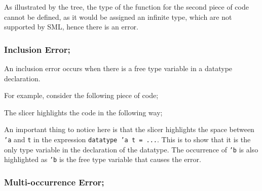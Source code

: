 \documentclass{report}
\begin{document}
\begin{itemize}



As illustrated by the tree, the type of the function for the second
piece of code cannot be defined, as it would be assigned an infinite
type, which are not supported by SML, hence there is an error.





\newpage


\subsubsection{Inclusion Error;}

\subitem An inclusion error occurs when there is a free type variable
in a datatype declaration.

For example, consider the following piece of code;


The slicer highlights the code in the following way;


An important thing to notice here is that the slicer highlights the
space between \texttt{'a} and \texttt{t} in the
expression \texttt{datatype 'a t = ...}. This is to show that
it is the only type variable in the declaration of the datatype. The
occurrence of \texttt{'b} is also highlighted as
\texttt{'b} is the free
type variable that causes the error.




\vspace{1in}


\subsubsection{Multi-occurrence Error;}


\end{itemize}
\end{document}
